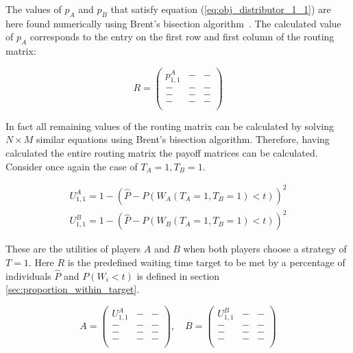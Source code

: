 The values of \(p_A\) and \(p_B\) that satisfy equation 
(\ref{eq:obj_distributor_1_1}) are here found numerically using Brent's 
bisection algorithm~\cite{brent1973algorithms}.
The calculated value of \(p_A\) corresponds to the entry on the first row and 
first column of the routing matrix:

\begin{equation}\label{eq:routing_matrix_1_1}
    R = 
    \begin{pmatrix}
        p_{1,1}^A & - & - \\
        - & - & - \\
        - & - & - \\
        - & - & - \\
    \end{pmatrix}
\end{equation}

In fact all remaining values of the routing matrix can be calculated by
solving \(N \times M\) similar equations using Brent's bisection algorithm.
Therefore, having calculated the entire routing matrix the payoff matrices can
be calculated.
Consider once again the case of \(T_A=1, T_B=1\). 


\begin{align}
    U_{1, 1}^A = 1 -\left( 
        \hat{P} - P(W_A(T_A=1, T_B=1) < t) 
    \right)^2 \nonumber
    \\
    U_{1, 1}^B = 1 -\left( 
        \hat{P} - P(W_B(T_A=1, T_B=1) < t) 
    \right)^2 \label{eq:payoff_entry_1_1}
\end{align}

These are the utilities of players \(A\) and \(B\) when both players choose a
strategy of \(T = 1\).
Here \(R\) is the predefined waiting time target to be met by a percentage of 
individuals \( \hat{P} \) and \(P(W_i < t)\) is defined in section
\ref{sec:proportion_within_target}.

\begin{equation}\label{eq:payoff_matrices_1_1}
    A = 
    \begin{pmatrix}
        U_{1, 1}^A & - & - \\
        - & - & - \\
        - & - & - \\
        - & - & - \\
    \end{pmatrix}, \quad
    B = 
    \begin{pmatrix}
        U_{1, 1}^B & - & - \\
        - & - & - \\
        - & - & - \\
        - & - & - \\
    \end{pmatrix}
\end{equation}

